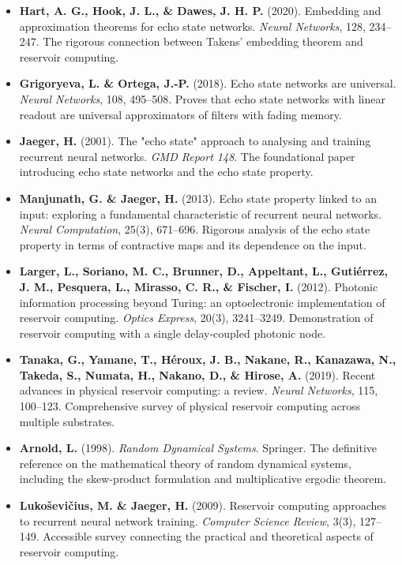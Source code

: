 \begin{itemize}[nosep]
  \item \textbf{Hart, A. G., Hook, J. L., \& Dawes, J. H. P.} (2020). Embedding and approximation theorems for echo state networks. \textit{Neural Networks}, 128, 234--247. The rigorous connection between Takens' embedding theorem and reservoir computing.

  \item \textbf{Grigoryeva, L. \& Ortega, J.-P.} (2018). Echo state networks are universal. \textit{Neural Networks}, 108, 495--508. Proves that echo state networks with linear readout are universal approximators of filters with fading memory.

  \item \textbf{Jaeger, H.} (2001). The "echo state" approach to analysing and training recurrent neural networks. \textit{GMD Report 148}. The foundational paper introducing echo state networks and the echo state property.

  \item \textbf{Manjunath, G. \& Jaeger, H.} (2013). Echo state property linked to an input: exploring a fundamental characteristic of recurrent neural networks. \textit{Neural Computation}, 25(3), 671--696. Rigorous analysis of the echo state property in terms of contractive maps and its dependence on the input.

  \item \textbf{Larger, L., Soriano, M. C., Brunner, D., Appeltant, L., Gutiérrez, J. M., Pesquera, L., Mirasso, C. R., \& Fischer, I.} (2012). Photonic information processing beyond Turing: an optoelectronic implementation of reservoir computing. \textit{Optics Express}, 20(3), 3241--3249. Demonstration of reservoir computing with a single delay-coupled photonic node.

  \item \textbf{Tanaka, G., Yamane, T., Héroux, J. B., Nakane, R., Kanazawa, N., Takeda, S., Numata, H., Nakano, D., \& Hirose, A.} (2019). Recent advances in physical reservoir computing: a review. \textit{Neural Networks}, 115, 100--123. Comprehensive survey of physical reservoir computing across multiple substrates.

  \item \textbf{Arnold, L.} (1998). \textit{Random Dynamical Systems}. Springer. The definitive reference on the mathematical theory of random dynamical systems, including the skew-product formulation and multiplicative ergodic theorem.

  \item \textbf{Lukoševičius, M. \& Jaeger, H.} (2009). Reservoir computing approaches to recurrent neural network training. \textit{Computer Science Review}, 3(3), 127--149. Accessible survey connecting the practical and theoretical aspects of reservoir computing.
\end{itemize}

